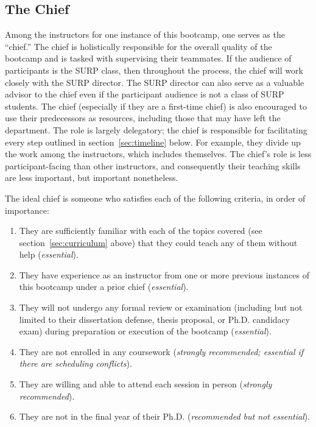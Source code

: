 \subsection{The Chief}
\label{sec:instructors:chief}
\noindent
Among the instructors for one instance of this bootcamp, one serves as the
``chief.''
The chief is holistically responsible for the overall quality of the bootcamp
and is tasked with supervising their teammates.
If the audience of participants is the SURP class, then throughout the process,
the chief will work closely with the SURP director.
The SURP director can also serve as a valuable advisor to the chief even if the
participant audience is not a class of SURP students.
The chief (especially if they are a first-time chief) is also encouraged to use
their predecessors as resources, including those that may have left the
department.
The role is largely delegatory; the chief is responsible for facilitating
every step outlined in section~\ref{sec:timeline} below.
For example, they divide up the work among the instructors, which includes
themselves.
The chief’s role is less participant-facing than other instructors, and
consequently their teaching skills are less important, but important
nonetheless.
\par
The ideal chief is someone who satisfies each of the following criteria, in
order of importance:
\begin{enumerate}[topsep=0pt, itemsep=0pt, partopsep=0pt, parsep=0pt]

	\item They are sufficiently familiar with each of the topics covered (see
	section~\ref{sec:curriculum} above) that they could teach any of them
	without help (\textit{essential}).

	\item They have experience as an instructor from one or more previous
	instances of this bootcamp under a prior chief (\textit{essential}).

	\item They will not undergo any formal review or examination (including but
	not limited to their dissertation defense, thesis proposal, or Ph.D.
	candidacy exam) during preparation or execution of the bootcamp
	(\textit{essential}).

	\item They are not enrolled in any coursework (\textit{strongly
	recommended; essential if there are scheduling conflicts}).

	\item They are willing and able to attend each session in person
	(\textit{strongly recommended}).

	\item They are not in the final year of their Ph.D. (\textit{recommended
	but not essential}).
\end{enumerate}
